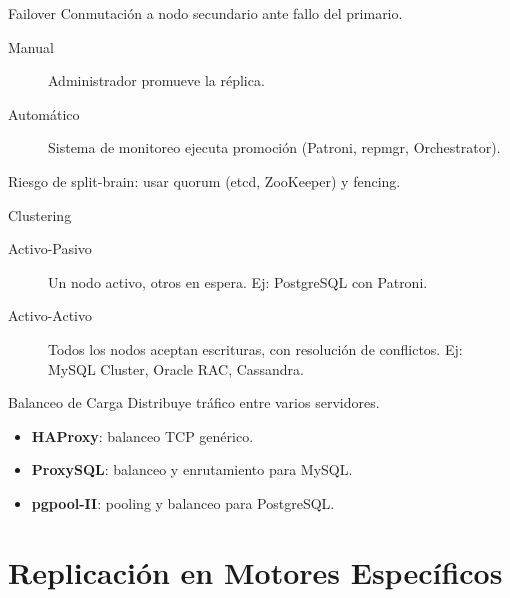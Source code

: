 \documentclass[aspectratio=169, 10pt, xcolor=table]{beamer}
\begin{document}
\begin{frame}{Failover}
    Conmutación a nodo secundario ante fallo del primario.
    \begin{description}
        \item[Manual] Administrador promueve la réplica.
        \item[Automático] Sistema de monitoreo ejecuta promoción (Patroni, repmgr, Orchestrator).
    \end{description}
    \alert{Riesgo de split-brain: usar quorum (etcd, ZooKeeper) y fencing.}
\end{frame}

\begin{frame}{Clustering}
    \begin{description}
        \item[Activo-Pasivo] Un nodo activo, otros en espera. Ej: PostgreSQL con Patroni.
        \item[Activo-Activo] Todos los nodos aceptan escrituras, con resolución de conflictos. Ej: MySQL Cluster, Oracle RAC, Cassandra.
    \end{description}
\end{frame}

\begin{frame}{Balanceo de Carga}
    Distribuye tráfico entre varios servidores.
    \begin{itemize}
        \item \textbf{HAProxy}: balanceo TCP genérico.
        \item \textbf{ProxySQL}: balanceo y enrutamiento para MySQL.
        \item \textbf{pgpool-II}: pooling y balanceo para PostgreSQL.
    \end{itemize}
\end{frame}

\section{Replicación en Motores Específicos}
\end{document}
